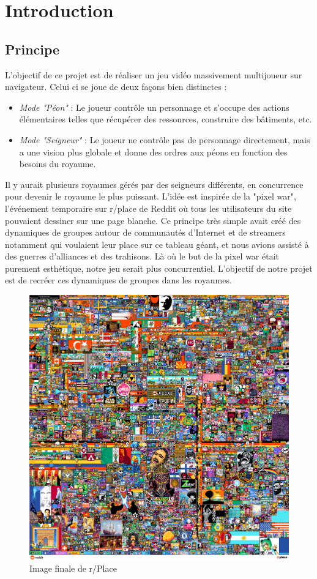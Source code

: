 \section{Introduction}
    \subsection{Principe}
        L'objectif de ce projet est de réaliser un jeu vidéo massivement multijoueur sur navigateur. Celui ci se joue de deux façons bien distinctes :
        \begin{itemize}
            \item \textit{Mode "Péon"} : Le joueur contrôle un personnage et s'occupe des actions élémentaires telles que récupérer des ressources, construire des bâtiments, etc.
            \item \textit{Mode "Seigneur"} : Le joueur ne contrôle pas de personnage directement, mais a une vision plus globale et donne des ordres aux péons en fonction des besoins du royaume.
        \end{itemize}
        Il y aurait plusieurs royaumes gérés par des seigneurs différents, en concurrence pour devenir le royaume le plus puissant. L'idée est inspirée de la "pixel war", l'événement temporaire sur r/place de Reddit où tous les utilisateurs du site pouvaient dessiner sur une page blanche. Ce principe très simple avait créé des dynamiques de groupes autour de communautés d'Internet et de streamers notamment qui voulaient leur place sur ce tableau géant, et nous avions assisté à des guerres d'alliances et des trahisons. Là où le but de la pixel war était purement esthétique, notre jeu serait plus concurrentiel. L'objectif de notre projet est de recréer ces dynamiques de groupes dans les royaumes.


        \begin{figure}[!h]
            \centering
            \includegraphics[width=0.5\linewidth]{images/pixelwar.png}
            \caption{Image finale de r/Place}
            \label{fig:enter-label}
        \end{figure}